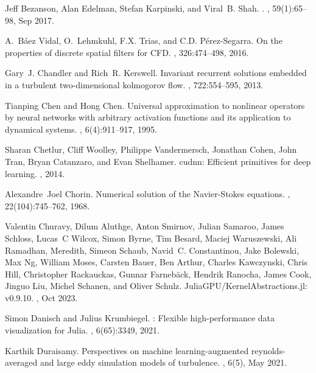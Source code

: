 \documentclass[preprint]{elsarticle}
\begin{document}
\begin{thebibliography}{10}
Jeff Bezanson, Alan Edelman, Stefan Karpinski, and Viral~B. Shah.
.
, 59(1):65--98, Sep 2017.

A.~{Báez Vidal}, O.~Lehmkuhl, F.X. Trias, and C.D. Pérez-Segarra.
\newblock On the properties of discrete spatial filters for {CFD}.
, 326:474--498, 2016.

Gary~J. Chandler and Rich~R. Kerswell.
\newblock Invariant recurrent solutions embedded in a turbulent two-dimensional kolmogorov flow.
, 722:554–595, 2013.

Tianping Chen and Hong Chen.
\newblock Universal approximation to nonlinear operators by neural networks with arbitrary activation functions and its application to dynamical systems.
, 6(4):911--917, 1995.

Sharan Chetlur, Cliff Woolley, Philippe Vandermersch, Jonathan Cohen, John Tran, Bryan Catanzaro, and Evan Shelhamer.
\newblock cudnn: Efficient primitives for deep learning.
, 2014.

Alexandre~Joel Chorin.
\newblock Numerical solution of the {N}avier-{S}tokes equations.
, 22(104):745--762, 1968.

Valentin Churavy, Dilum Aluthge, Anton Smirnov, Julian Samaroo, James Schloss, Lucas~C Wilcox, Simon Byrne, Tim Besard, Maciej Waruszewski, Ali Ramadhan, Meredith, Simeon Schaub, Navid~C. Constantinou, Jake Bolewski, Max Ng, William Moses, Carsten Bauer, Ben Arthur, Charles Kawczynski, Chris Hill, Christopher Rackauckas, Gunnar Farnebäck, Hendrik Ranocha, James Cook, Jinguo Liu, Michel Schanen, and Oliver Schulz.
\newblock Julia{GPU}/{K}ernel{A}bstractions.jl: v0.9.10.
, Oct 2023.

Simon Danisch and Julius Krumbiegel.
: Flexible high-performance data visualization for {Julia}.
, 6(65):3349, 2021.

Karthik Duraisamy.
\newblock Perspectives on machine learning-augmented reynolds-averaged and large eddy simulation models of turbulence.
, 6(5), May 2021.


\end{thebibliography}
\end{document}
